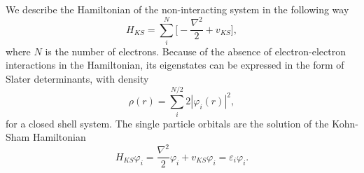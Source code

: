 \documentclass[a4paper,10pt,english]{article}%
\begin{document}
We describe the Hamiltonian of the non-interacting system in the following way
\begin{equation}
  H_{KS}=\sum_{i}^N\big[-\frac{\nabla^2}{2}+v_{KS}\big],
  \label{s2eq:Hks}
\end{equation}
where $N$ is the number of electrons. Because of the absence of 
electron-electron interactions in the Hamiltonian, its eigenstates can be 
expressed in the form of Slater determinants, with density
\begin{equation}
  \rho(r)=\sum_i^{N/2}2|\varphi_i(r)|^2,
  \label{s2eq:KSdens}
\end{equation}
for a closed shell system. The single particle orbitals are the solution of the
Kohn-Sham Hamiltonian
\begin{equation}
  H_{KS}\varphi_i=\frac{\nabla^2}{2}\varphi_i+v_{KS}\varphi_i=\varepsilon_i\varphi_i.
  \label{s2eq:kseigfe}
\end{equation}
\end{document}

